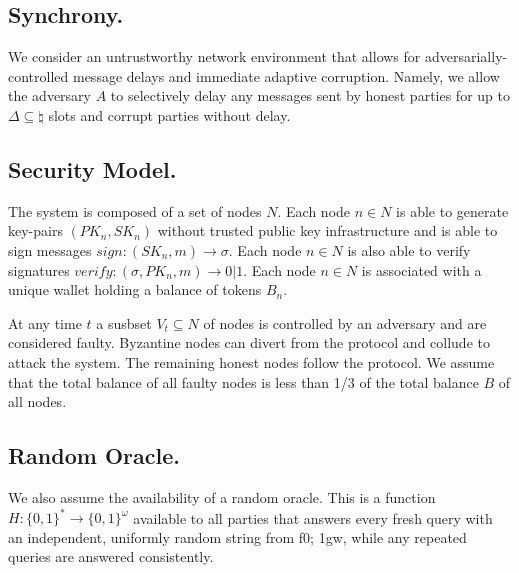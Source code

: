 \subsection{Synchrony.}\label{subsec:synchrony.}
We consider an untrustworthy network environment that allows for adversarially-controlled message delays and immediate adaptive corruption.
Namely, we allow the adversary $A$ to selectively delay any messages sent by honest parties for up to $\Delta \subseteq \natural$ slots and corrupt parties without delay.

\subsection{Security Model.}\label{subsec:security-model.}
The system is composed of a set of nodes $N$.
Each node $n \in N$ is able to generate key-pairs ${(PK_n, SK_n)}$ without trusted public key infrastructure and is able to sign messages ${sign: (SK_n, m) \rightarrow \sigma}$.
Each node $n \in N$ is also able to verify signatures ${verify: (\sigma, PK_n, m) \rightarrow 0 | 1}$.
Each node $n \in N$ is associated with a unique wallet holding a balance of tokens $B_n$.

At any time $t$ a susbset ${V_t \subseteq N}$ of nodes is controlled by an adversary and are considered faulty.
Byzantine nodes can divert from the protocol and collude to attack the system.
The remaining honest nodes follow the protocol.
We assume that the total balance of all faulty nodes is less than 1/3 of the total balance $B$ of all nodes.

\subsection{Random Oracle.}\label{subsec:random-oracle.}
We also assume the availability of a random oracle.
This is a function $H: \{0,1\}^* \rightarrow \{0,1\}^\omega$ available to all parties that answers every fresh query with an independent, uniformly random string from f0; 1gw, while any repeated queries are answered consistently.

